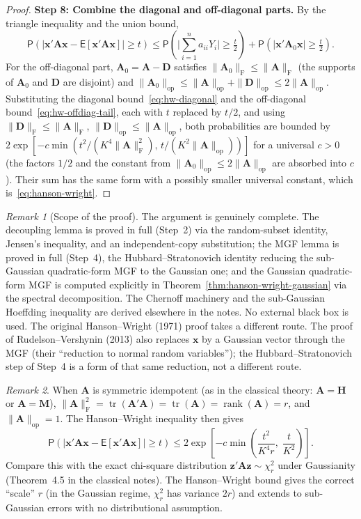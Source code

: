 \documentclass[14pt]{extarticle}
\theoremstyle{plain}
\theoremstyle{definition}
\theoremstyle{remark}
\newtheorem*{remark}{Remark}
\newcommand\expc{\mathsf{E}}
\newcommand\prb{\mathsf{P}}
\DeclareMathOperator\tr{tr}
\DeclareMathOperator\rank{rank}
\newcommand{\bx}{\mathbf{x}}
\newcommand{\bH}{\mathbf{H}}
\newcommand{\bM}{\mathbf{M}}
\newcommand{\bz}{\mathbf{z}}
\newcommand{\bA}{\mathbf{A}}
\newcommand{\bD}{\mathbf{D}}
\newcommand{\opnorm}[1]{\|#1\|_{\mathrm{op}}}
\newcommand{\fnorm}[1]{\|#1\|_{\mathrm{F}}}
\begin{document}
\begin{proof}
\textbf{Step 8: Combine the diagonal and off-diagonal parts.} By the triangle inequality and the union bound,
\[
\prb\!\left(|\bx'\bA\bx - \expc[\bx'\bA\bx]| \geqslant t\right) \leqslant \prb\!\left(\Big|\sum_{i=1}^n a_{ii}Y_i\Big| \geqslant \tfrac{t}{2}\right) + \prb\!\left(|\bx'\bA_0\bx| \geqslant \tfrac{t}{2}\right).
\]
For the off-diagonal part, $\bA_0 = \bA - \bD$ satisfies $\fnorm{\bA_0} \leqslant \fnorm{\bA}$ (the supports of $\bA_0$ and $\bD$ are disjoint) and $\opnorm{\bA_0} \leqslant \opnorm{\bA} + \opnorm{\bD} \leqslant 2\opnorm{\bA}$. Substituting the diagonal bound~\eqref{eq:hw-diagonal} and the off-diagonal bound~\eqref{eq:hw-offdiag-tail}, each with $t$ replaced by $t/2$, and using $\fnorm{\bD} \leqslant \fnorm{\bA}$, $\opnorm{\bD} \leqslant \opnorm{\bA}$, both probabilities are bounded by $2\exp[-c\min(t^2/(K^4\fnorm{\bA}^2),\, t/(K^2\opnorm{\bA}))]$ for a universal $c > 0$ (the factors $1/2$ and the constant from $\opnorm{\bA_0} \leqslant 2\opnorm{\bA}$ are absorbed into $c$). Their sum has the same form with a possibly smaller universal constant, which is~\eqref{eq:hanson-wright}.
\end{proof}

\begin{remark}[Scope of the proof]
The argument is genuinely complete. The decoupling lemma is proved in full (Step~2) via the random-subset identity, Jensen's inequality, and an independent-copy substitution; the MGF lemma is proved in full (Step~4), the Hubbard--Stratonovich identity reducing the sub-Gaussian quadratic-form MGF to the Gaussian one; and the Gaussian quadratic-form MGF is computed explicitly in Theorem~\ref{thm:hanson-wright-gaussian} via the spectral decomposition. The Chernoff machinery and the sub-Gaussian Hoeffding inequality are derived elsewhere in the notes. No external black box is used. The original Hanson--Wright (1971) proof takes a different route. The proof of Rudelson--Vershynin (2013) also replaces $\bx$ by a Gaussian vector through the MGF (their ``reduction to normal random variables''); the Hubbard--Stratonovich step of Step~4 is a form of that same reduction, not a different route.
\end{remark}

\begin{remark}
When $\bA$ is symmetric idempotent (as in the classical theory: $\bA = \bH$ or $\bA = \bM$), $\fnorm{\bA}^2 = \tr(\bA'\bA) = \tr(\bA) = \rank(\bA) = r$, and $\opnorm{\bA} = 1$. The Hanson--Wright inequality then gives
\[
\prb\!\left(|\bx'\bA\bx - \expc[\bx'\bA\bx]| \geqslant t\right) \leqslant 2\exp\!\left[-c\min\!\left(\frac{t^2}{K^4 r},\; \frac{t}{K^2}\right)\right].
\]
Compare this with the exact chi-square distribution $\bz'\bA\bz \sim \chi^2_r$ under Gaussianity (Theorem~4.5 in the classical notes). The Hanson--Wright bound gives the correct ``scale'' $r$ (in the Gaussian regime, $\chi^2_r$ has variance $2r$) and extends to sub-Gaussian errors with no distributional assumption.
\end{remark}
\end{document}

